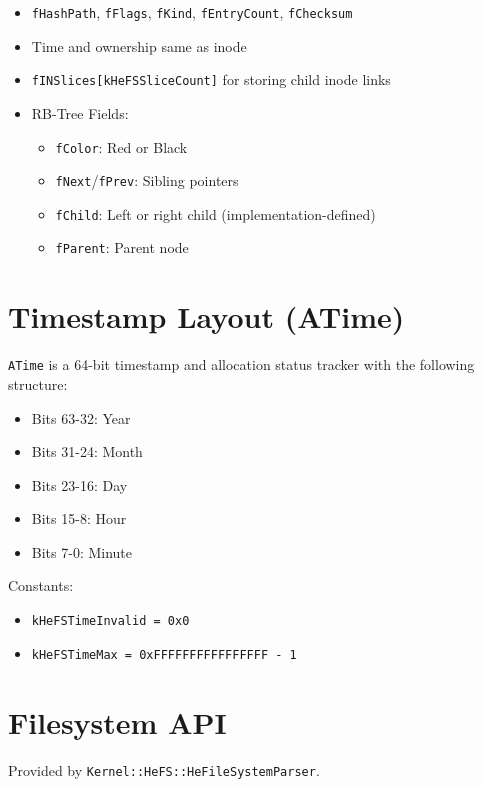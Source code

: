 \documentclass{article}
\begin{document}
\begin{itemize}
  \item \texttt{fHashPath}, \texttt{fFlags}, \texttt{fKind}, \texttt{fEntryCount}, \texttt{fChecksum}
  \item Time and ownership same as inode
  \item \texttt{fINSlices[kHeFSSliceCount]} for storing child inode links
\item RB-Tree Fields:
\begin{itemize}
  \item \texttt{fColor}: Red or Black
  \item \texttt{fNext}/\texttt{fPrev}: Sibling pointers
  \item \texttt{fChild}: Left or right child (implementation-defined)
  \item \texttt{fParent}: Parent node
\end{itemize}

\end{itemize}

\section{Timestamp Layout (ATime)}\label{sec:timestamp-layout-(atime)}

\texttt{ATime} is a 64-bit timestamp and allocation status tracker with the following structure:

\begin{itemize}
  \item Bits 63-32: Year
  \item Bits 31-24: Month
  \item Bits 23-16: Day
  \item Bits 15-8: Hour
  \item Bits 7-0: Minute
\end{itemize}

Constants:
\begin{itemize}
  \item \texttt{kHeFSTimeInvalid = 0x0}
  \item \texttt{kHeFSTimeMax = 0xFFFFFFFFFFFFFFFF - 1}
\end{itemize}

\section{Filesystem API}\label{sec:filesystem-api}

Provided by \texttt{Kernel::HeFS::HeFileSystemParser}.
\end{document}
